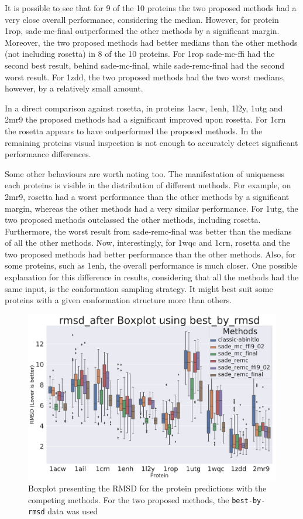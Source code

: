 It is possible to see that for 9 of the 10 proteins the
two proposed methods had a very close overall performance, considering the median.
However, for protein 1rop, sade-mc-final outperformed the other methods by a
significant margin. Moreover, the two proposed methods had better medians than
the other methods (not including rosetta) in 8 of the 10 proteins. For 1rop
sade-mc-ffi had the second best result, behind sade-mc-final, while sade-remc-final
had the second worst result. For 1zdd, the two proposed methods had the two worst
medians, however, by a relatively small amount.

In a direct comparison against rosetta, in proteins 1acw, 1enh, 1l2y, 1utg and 2mr9
the proposed methods had a significant improved upon rosetta. For 1crn the rosetta
appears to have outperformed the proposed methods. In the remaining proteins visual
inspection is not enough to accurately detect significant performance differences.

Some other behaviours are worth noting too. The manifestation of uniqueness each
proteins is visible in the distribution of different methods. For example, on
2mr9, rosetta had a worst performance than the other methods by a significant margin,
whereas the other methods had a very similar performance. For 1utg, the two proposed
methods outclassed the other methods, including rosetta. Furthermore, the worst
result from sade-remc-final was better than the medians of all the other methods.
Now, interestingly, for 1wqc and 1crn, rosetta and the two proposed methods had
better performance than the other methods. Also, for some proteins, such as 1enh,
the overall performance is much closer. One possible explanation for this difference
in results, considering that all the methods had the same input, is the conformation
sampling strategy. It might best suit some proteins with a given conformation
structure more than others.

\begin{figure}
  \includegraphics[width=\linewidth]{Figuras/boxplots/boxplot_best_by_rmsd_rmsd_after.pdf}
  \caption{Boxplot presenting the RMSD for the protein predictions with the
    competing methods. For the two proposed methods, the \texttt{best-by-rmsd}
    data was used}
  \label{fig:boxplot-rmsd}
\end{figure}

